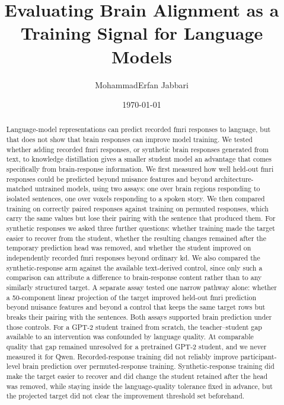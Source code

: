 \documentclass[11pt]{article}
\title{Evaluating Brain Alignment as a Training Signal for Language Models}
\author{MohammadErfan Jabbari}
\date{\today}
\begin{document}
\maketitle

\begin{abstract}

Language-model representations can predict recorded \ac{fmri} responses to language, but that does not show that brain responses can improve model training.
We tested whether adding recorded \ac{fmri} responses, or synthetic brain responses generated from text, to knowledge distillation gives a smaller student model an advantage that comes specifically from brain-response information.
We first measured how well held-out \ac{fmri} responses could be predicted beyond nuisance features and beyond architecture-matched untrained models, using two assays: one over brain regions responding to isolated sentences, one over voxels responding to a spoken story.
We then compared training on correctly paired responses against training on permuted responses, which carry the same values but lose their pairing with the sentence that produced them.
For synthetic responses we asked three further questions: whether training made the target easier to recover from the student, whether the resulting changes remained after the temporary prediction head was removed, and whether the student improved on independently recorded \ac{fmri} responses beyond ordinary \ac{kd}.
We also compared the synthetic-response arm against the available text-derived control, since only such a comparison can attribute a difference to brain-response content rather than to any similarly structured target.
A separate assay tested one narrow pathway alone: whether a 50-component linear projection of the target improved held-out \ac{fmri} prediction beyond nuisance features and beyond a control that keeps the same target rows but breaks their pairing with the sentences.
Both assays supported brain prediction under those controls.
For a GPT-2 student trained from scratch, the teacher--student gap available to an intervention was confounded by language quality.
At comparable quality that gap remained unresolved for a pretrained GPT-2 student, and we never measured it for Qwen.
Recorded-response training did not reliably improve participant-level brain prediction over permuted-response training.
Synthetic-response training did make the target easier to recover and did change the student retained after the head was removed, while staying inside the language-quality tolerance fixed in advance, but the projected target did not clear the improvement threshold set beforehand.

\end{abstract}
\end{document}
